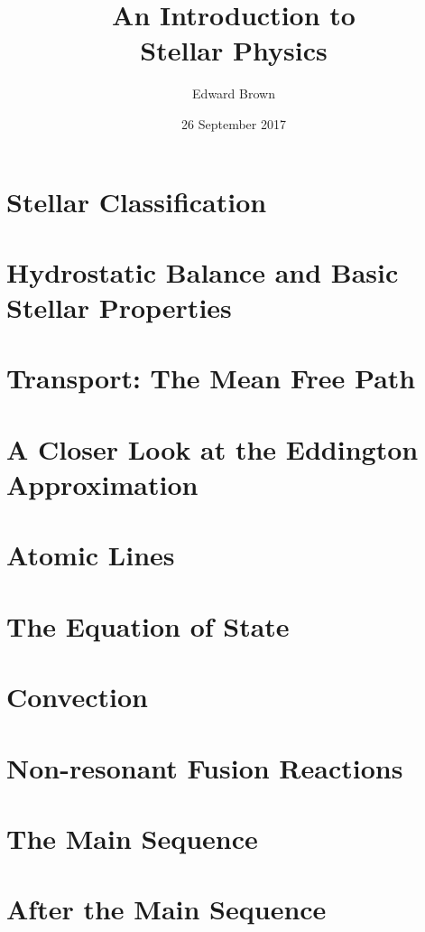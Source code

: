 \documentclass[profonts,stix]{astro-bookshelf}
\title{An Introduction to\\ Stellar Physics}
\author{Edward Brown}
\date{26 September 2017}
\begin{document}
\frontmatter
{}


\mainmatter
{}
\setcounter{page}{1}

\chapter{Stellar Classification}\label{ch.classifying-stars}


\chapter{Hydrostatic Balance and Basic Stellar Properties}\label{ch.hydrostatic-balance}


\chapter{Transport: The Mean Free Path}\label{ch.mean-free-path}


\chapter{A Closer Look at the Eddington Approximation}\label{ch.stellar-atmospheres}


\chapter{Atomic Lines}\label{ch.atomic-lines}


\chapter{The Equation of State}\label{ch.degeneracy}


\chapter{Convection}\label{ch.convection}


\chapter{Non-resonant Fusion Reactions}\label{ch.nuclear-burning}


\chapter{The Main Sequence}\label{ch.main-sequence}


\chapter{After the Main Sequence}\label{ch.post-main-sequence}



\backmatter


\end{document}
